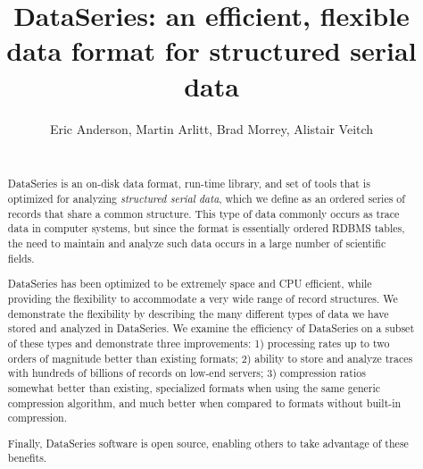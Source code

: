 \documentclass{acm_proc_article-sp}
\begin{document}
\title{DataSeries: an efficient, flexible data format for structured serial data}
\author{
\alignauthor
Eric Anderson, Martin Arlitt, Brad Morrey, Alistair Veitch  \\
  \\
}

\maketitle
\begin{abstract}

DataSeries is an on-disk data format, run-time library, and set of
tools that is optimized for analyzing \textit{structured serial data},
which we define as an ordered series of records that share a common
structure.  This type of data commonly occurs as trace data in
computer systems, but since the format is essentially ordered RDBMS
tables, the need to maintain and analyze such data occurs in a large
number of scientific fields.

DataSeries has been optimized to be extremely space and CPU efficient,
while providing the flexibility to accommodate a very wide range of
record structures. We demonstrate the flexibility by describing the
many different types of data we have stored and analyzed in
DataSeries.  We examine the efficiency of DataSeries on a subset of
these types and demonstrate three improvements: 1) processing rates up
to two orders of magnitude better than existing formats; 2) ability to
store and analyze traces with hundreds of billions of records on
low-end servers; 3) compression ratios somewhat better than existing,
specialized formats when using the same generic compression algorithm,
and much better when compared to formats without built-in
compression. 

Finally, DataSeries software is open source, enabling others to take
advantage of these benefits.

\end{abstract}

 
\end{document}

